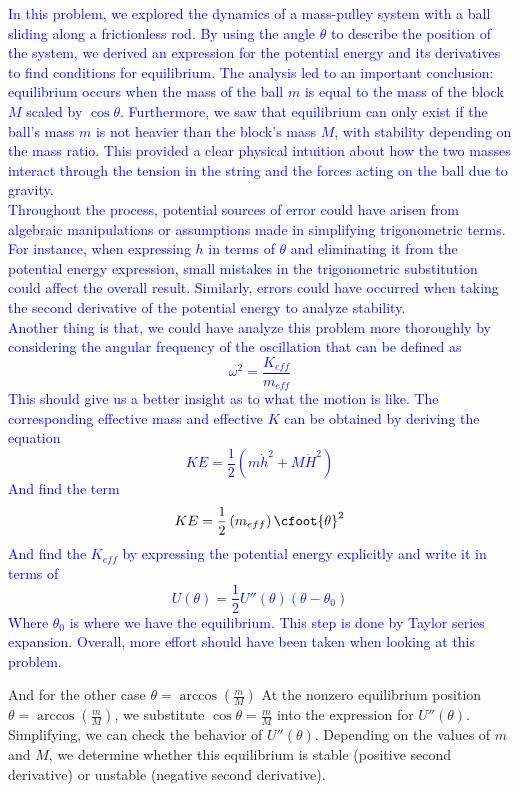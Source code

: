 \documentclass[12pt]{article}
\newcommand{\paren}[1]{\left( #1 \right)}
\begin{document}
\begin{itemize}
    \textcolor{blue}{
    In this problem, we explored the dynamics of a mass-pulley system with a ball sliding along a frictionless rod. By using the angle \(\theta\) to describe the position of the system, we derived an expression for the potential energy and its derivatives to find conditions for equilibrium. The analysis led to an important conclusion: equilibrium occurs when the mass of the ball \(m\) is equal to the mass of the block \(M\) scaled by \(\cos\theta\). Furthermore, we saw that equilibrium can only exist if the ball's mass \(m\) is not heavier than the block’s mass \(M\), with stability depending on the mass ratio. This provided a clear physical intuition about how the two masses interact through the tension in the string and the forces acting on the ball due to gravity.\\
    Throughout the process, potential sources of error could have arisen from algebraic manipulations or assumptions made in simplifying trigonometric terms. For instance, when expressing \(h\) in terms of \(\theta\) and eliminating it from the potential energy expression, small mistakes in the trigonometric substitution could affect the overall result. Similarly, errors could have occurred when taking the second derivative of the potential energy to analyze stability. \\
    Another thing is that, we could have analyze this problem more thoroughly by considering the angular frequency of the oscillation that can be defined as
    \[
    \omega^2 = \frac{K_{eff}}{m_{eff}}
    \]
    This should give us a better insight as to what the motion is like. The corresponding effective mass and effective $K$ can be obtained by deriving the equation
    \[
    KE = \frac{1}{2}\paren{m\dot{h}^2+M\dot{H}^2}
    \]
    And find the term 
    \[
    KE = \frac{1}{2}\paren{m_{eff}}\cfoot{\theta}^2
    \]
    And find the $K_{eff}$ by expressing the potential energy explicitly and write it in terms of
    \[
    U(\theta) = \frac{1}{2}U''(\theta)(\theta - \theta_0)
    \]
    Where $\theta_0$ is where we have the equilibrium. This step is done by Taylor series expansion. Overall, more effort should have been taken when looking at this problem.
    }

   And for the other case \( \theta = \arccos\left(\frac{m}{M}\right) \)
    At the nonzero equilibrium position \( \theta = \arccos\left(\frac{m}{M}\right) \), we substitute \( \cos\theta = \frac{m}{M} \) into the expression for \( U''(\theta) \). Simplifying, we can check the behavior of \( U''(\theta) \). Depending on the values of \(m\) and \(M\), we determine whether this equilibrium is stable (positive second derivative) or unstable (negative second derivative).
    
    
    
\end{itemize}
\end{document}
